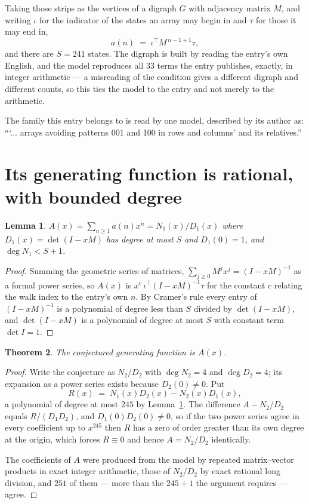 \documentclass[11pt,a4paper]{article}
\theoremstyle{plain}
\newtheorem{theorem}{Theorem}
\newtheorem{lemma}[theorem]{Lemma}
\theoremstyle{definition}
\begin{document}
Taking those strips as the vertices of a digraph $G$ with adjacency matrix $M$, and writing
$\iota$ for the indicator of the states an array may begin in and $\tau$ for those it may end
in,
\[
a(n)\;=\;\iota^{\!\top}M^{\,n-1+1}\tau ,
\]
and there are $S=241$ states. The digraph is built by reading the entry's own English, and the
model reproduces all $33$ terms the entry publishes, exactly, in integer arithmetic --- a
misreading of the condition gives a different digraph and different counts, so this ties the
model to the entry and not merely to the arithmetic.

The family this entry belongs to is read by one model, described by its author as: ```... arrays avoiding patterns 001 and 100 in rows and columns' and its relatives.''


\section{Its generating function is rational, with bounded degree}

\begin{lemma}\label{lem:rat}
$A(x)=\sum_{n\ge1}a(n)x^n=N_1(x)/D_1(x)$ where $D_1(x)=\det(I-xM)$ has degree at most
$S$ and $D_1(0)=1$, and $\deg N_1<S+1$.
\end{lemma}

\begin{proof}
Summing the geometric series of matrices, $\sum_{j\ge0}M^jx^j=(I-xM)^{-1}$ as a formal
power series, so $A(x)$ is $x^{c}\,\iota^{\!\top}(I-xM)^{-1}\tau$ for the constant $c$
relating the walk index to the entry's own $n$. By Cramer's rule every entry of
$(I-xM)^{-1}$ is a polynomial of degree less than $S$ divided by $\det(I-xM)$, and
$\det(I-xM)$ is a polynomial of degree at most $S$ with constant term $\det I=1$.
\end{proof}

\begin{theorem}
The conjectured generating function is $A(x)$.
\end{theorem}

\begin{proof}
Write the conjecture as $N_2/D_2$ with $\deg N_2=4$ and $\deg D_2=4$; its expansion as a
power series exists because $D_2(0)\neq0$. Put
\[
R(x)\;=\;N_1(x)D_2(x)-N_2(x)D_1(x),
\]
a polynomial of degree at most $245$ by Lemma~\ref{lem:rat}. The difference
$A-N_2/D_2$ equals $R/(D_1D_2)$, and $D_1(0)D_2(0)\neq0$, so if the two power series agree in
every coefficient up to $x^{245}$ then $R$ has a zero of order greater than its own
degree at the origin, which forces $R\equiv0$ and hence $A=N_2/D_2$ identically.

The coefficients of $A$ were produced from the model by repeated matrix--vector products in
exact integer arithmetic, those of $N_2/D_2$ by exact rational long division, and $251$
of them --- more than the $245+1$ the argument requires --- agree.
\end{proof}
\end{document}
